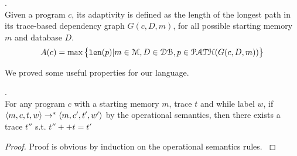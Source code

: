 \documentclass[a4paper,11pt]{article}
\begin{document}
%
%
%
\begin{defn}.
\label{def:trace-based_adapt}
\\
Given a program $c$, 
its adaptivity is defined as the length of the longest path in its
trace-based dependency graph $G(c,D,m)$, 
for all possible starting memory $m$ and database $D$.
%
$$
A(c) = \max \big \{ 
\mathtt{len}(p) \vert m \in \mathcal{M}, D \in \mathcal{DB},p \in \mathcal{PATH}(G(c, D, m)) 
\big \} 
$$
\end{defn}
%
We proved some useful properties for our language.
\begin{lem}
.
\\
{
For any program $c$ with a starting memory $m$, trace $t$ and while label $w$, if 
$  
\langle m, c, t, w \rangle 
\rightarrow^{*} 
\langle m, c', t', w' \rangle 
$ by the operational semantics, then there exists a trace $t''$ 
s.t. $t'' ++ t = t'$
}
\end{lem}
%
\begin{proof}
{
Proof is obvious by induction on the operational semantics rules.
}
\end{proof}
%
\end{document}
